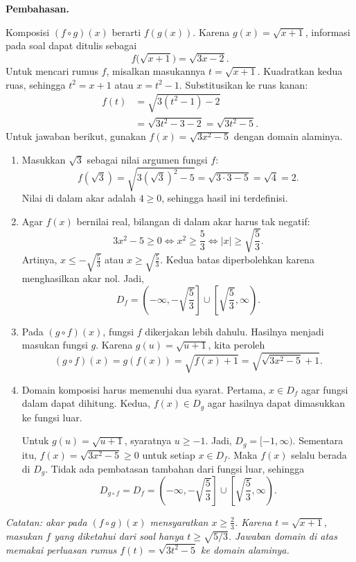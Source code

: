 \documentclass[12pt,a4paper]{article}
\newcommand{\pembahasan}{\par\medskip\textbf{Pembahasan.}\par\smallskip}
\begin{document}
\begin{enumerate}
    \pembahasan
    Komposisi $(f\circ g)(x)$ berarti $f(g(x))$.
    Karena $g(x)=\sqrt{x+1}$, informasi pada soal dapat ditulis sebagai
    \[
      f\bigl(\sqrt{x+1}\bigr)=\sqrt{3x-2}.
    \]
    Untuk mencari rumus $f$, misalkan masukannya $t=\sqrt{x+1}$.
    Kuadratkan kedua ruas, sehingga $t^2=x+1$ atau $x=t^2-1$.
    Substitusikan ke ruas kanan:
    \begin{align*}
      f(t)&=\sqrt{3(t^2-1)-2}\\
          &=\sqrt{3t^2-3-2}=\sqrt{3t^2-5}.
    \end{align*}
    Untuk jawaban berikut, gunakan $f(x)=\sqrt{3x^2-5}$ dengan domain alaminya.
    \begin{enumerate}
      \item Masukkan $\sqrt3$ sebagai nilai argumen fungsi $f$:
        \[
          f(\sqrt3)=\sqrt{3(\sqrt3)^2-5}
            =\sqrt{3\cdot3-5}=\sqrt4=\boxed{2}.
        \]
        Nilai di dalam akar adalah $4\ge0$, sehingga hasil ini terdefinisi.

      \item Agar $f(x)$ bernilai real, bilangan di dalam akar harus tak negatif:
        \[
          3x^2-5\ge0\iff x^2\ge\frac53
          \iff |x|\ge\sqrt{\frac53}.
        \]
        Artinya, $x\le-\sqrt{\frac53}$ atau $x\ge\sqrt{\frac53}$.
        Kedua batas diperbolehkan karena menghasilkan akar nol.
        Jadi,
        \[
          \boxed{D_f=\left(-\infty,-\sqrt{\frac53}\right]
            \cup\left[\sqrt{\frac53},\infty\right)}.
        \]

      \newpage
      \item Pada $(g\circ f)(x)$, fungsi $f$ dikerjakan lebih dahulu.
        Hasilnya menjadi masukan fungsi $g$.
        Karena $g(u)=\sqrt{u+1}$, kita peroleh
        \[
          (g\circ f)(x)=g(f(x))=\sqrt{f(x)+1}
          =\boxed{\sqrt{\sqrt{3x^2-5}+1}}.
        \]

      \item Domain komposisi harus memenuhi dua syarat.
        Pertama, $x\in D_f$ agar fungsi dalam dapat dihitung.
        Kedua, $f(x)\in D_g$ agar hasilnya dapat dimasukkan ke fungsi luar.

        Untuk $g(u)=\sqrt{u+1}$, syaratnya $u\ge-1$.
        Jadi, $D_g=[-1,\infty)$.
        Sementara itu, $f(x)=\sqrt{3x^2-5}\ge0$ untuk setiap $x\in D_f$.
        Maka $f(x)$ selalu berada di $D_g$.
        Tidak ada pembatasan tambahan dari fungsi luar, sehingga
        \[
          \boxed{D_{g\circ f}=D_f
            =\left(-\infty,-\sqrt{\frac53}\right]
            \cup\left[\sqrt{\frac53},\infty\right)}.
        \]
    \end{enumerate}
    \textit{Catatan: akar pada $(f\circ g)(x)$ mensyaratkan $x\ge\frac23$.
    Karena $t=\sqrt{x+1}$, masukan $f$ yang diketahui dari soal hanya
    $t\ge\sqrt{5/3}$. Jawaban domain di atas memakai perluasan rumus
    $f(t)=\sqrt{3t^2-5}$ ke domain alaminya.}
\end{enumerate}
\end{document}
